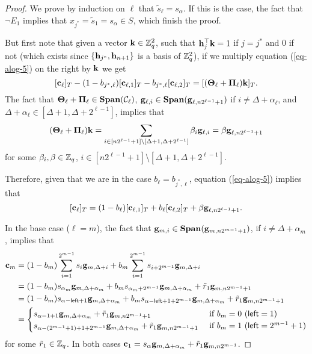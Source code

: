 \begin{proof}
We prove by induction on \(\ell\) that \(\tilde{s}_\ell=s_{\alpha}\). If this is the case, the fact that \(\neg E_1\) implies that \(x_{j^*}=\tilde{s}_1=s_{\alpha}\in S\), which finish the proof.

But first note that given a vector \(\mathbf{k}\in\mathbb{Z}_q^2\), such that \(\mathbf{h}_j^\top\mathbf{k}=1\) if \(j=j^*\) and \(0\) if not (which exists since \(\{\mathbf{h}_{j^*},\mathbf{h}_{n+1}\}\) is a basis of \(\mathbb{Z}_q^2\)), if we multiply equation (\ref{eq-alog-5}) on the right by $\mathbf{k}$ we get
$$
[\mathbf{c}_\ell]_T-(1-b_{j^*,\ell})[\mathbf{c}_{\ell,1}]_T-b_{j^*,\ell}[\mathbf{c}_{\ell,2}]_T=[(\mathbf{{\Theta}}_\ell+\mathbf{{\Pi}}_\ell)\mathbf{k}]_T.
$$
The fact that \(\mathbf{{\Theta}}_\ell+\mathbf{{\Pi}}_\ell\in\mathbf{Span}(\mathcal{C}_\ell)\), \(\mathbf{g}_{\ell,i}\in\mathbf{Span}(\mathbf{g}_{\ell,n2^{\ell-1}+1})\) if \(i\neq \Delta+\alpha_\ell\), and $\Delta+\alpha_\ell\in[\Delta+1,\Delta+2^{\ell-1}]$, implies that
$$(\mathbf{{\Theta}}_\ell+\mathbf{{\Pi}}_\ell)\mathbf{k} = \sum_{i\in[n2^{\ell-1}+1]\setminus[\Delta+1,\Delta+2^{\ell-1}]}\beta_i\mathbf{g}_{\ell,i}=\beta\mathbf{g}_{\ell,n2^{\ell-1}+1}$$
for some $\beta_i,{\beta}\in\mathbb{Z}_q$, $i\in[n2^{\ell-1}+1]\setminus[\Delta+1,\Delta+2^{\ell-1}]$.

Therefore, given that we are in the case $b_\ell=b_{j^*,\ell}$, equation (\ref{eq-alog-5}) implies that
$$
[\mathbf{c}_\ell]_T=(1-b_{\ell})[\mathbf{c}_{\ell,1}]_T+b_{\ell}[\mathbf{c}_{\ell,2}]_T+\beta\mathbf{g}_{\ell,n2^{\ell-1}+1}.
$$

In the base case ($\ell=m$), the fact that \(\mathbf{g}_{m,i}\in\mathbf{Span}(\mathbf{g}_{m,n2^{m-1}+1})\), if \(i\neq \Delta+\alpha_m\), implies that 
\begin{align*}
\mathbf{c}_m &= (1-b_m)\sum_{i=1}^{2^{m-1}}s_i \mathbf{g}_{m,\Delta+i}+b_m\sum_{i=1}^{2^{m-1}}s_{i+2^{m-1}}\mathbf{g}_{m,\Delta+i}\\
&= (1-b_m)s_{\alpha_m}\mathbf{g}_{m,\Delta+\alpha_m} +b_ms_{\alpha_m+2^{m-1}}\mathbf{g}_{m,\Delta+\alpha_m}+\tilde{r}_1\mathbf{g}_{m,n2^{m-1}+1}\\
&= (1-b_m)s_{\alpha-{\mathsf{left}}+1}\mathbf{g}_{m,\Delta+\alpha_m} +b_ms_{\alpha-{\mathsf{left}}+1+2^{m-1}}\mathbf{g}_{m,\Delta+\alpha_m}+\tilde{r}_1\mathbf{g}_{m,n2^{m-1}+1}\\
&=\begin{cases}
    s_{\alpha-1+1}\mathbf{g}_{m,\Delta+\alpha_m}+\tilde{r}_1\mathbf{g}_{m,n2^{m-1}+1} & \text{ if } b_m=0 \ ({\mathsf{left}}=1) \\
    s_{\alpha-(2^{m-1}+1)+1+2^{m-1}}\mathbf{g}_{m,\Delta+\alpha_m}+\tilde{r}_1\mathbf{g}_{m,n2^{m-1}+1} & \text{ if } b_m=1 \ ({\mathsf{left}}=2^{m-1}+1) 
\end{cases}
\end{align*}
for some \(\tilde{r}_1\in\mathbb{Z}_q\). In both cases $\mathbf{c}_1=s_\alpha\mathbf{g}_{m,\Delta+\alpha_m}+\tilde{r}_1\mathbf{g}_{m,n2^{m-1}}$.


\end{proof}
